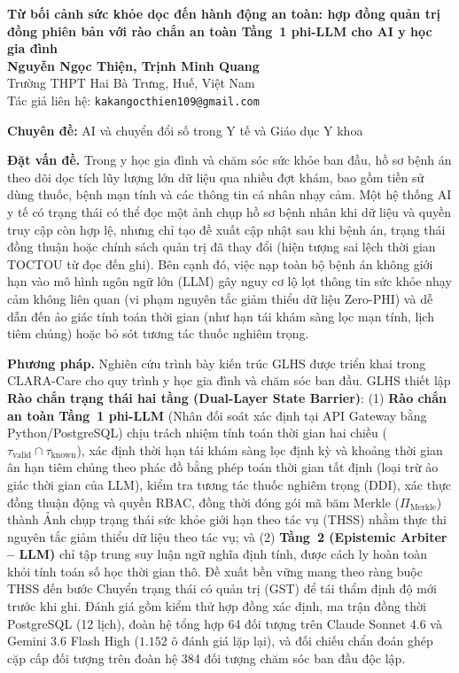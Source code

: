 \documentclass[11pt]{article}
\begin{document}
\begin{center}
{\Large\bfseries Từ bối cảnh sức khỏe dọc đến hành động an toàn: hợp đồng quản trị đồng phiên bản với rào chắn an toàn Tầng~1 phi-LLM cho AI y học gia đình}\\[0.7em]
\textbf{Nguyễn Ngọc Thiện, Trịnh Minh Quang}\\
Trường THPT Hai Bà Trưng, Huế, Việt Nam\\
Tác giả liên hệ: \texttt{kakangocthien109@gmail.com}
\end{center}
\textbf{Chuyên đề:} AI và chuyển đổi số trong Y tế và Giáo dục Y khoa

\textbf{Đặt vấn đề.} Trong y học gia đình và chăm sóc sức khỏe ban đầu, hồ sơ bệnh án theo dõi dọc tích lũy lượng lớn dữ liệu qua nhiều đợt khám, bao gồm tiền sử dùng thuốc, bệnh mạn tính và các thông tin cá nhân nhạy cảm. Một hệ thống AI y tế có trạng thái có thể đọc một ảnh chụp hồ sơ bệnh nhân khi dữ liệu và quyền truy cập còn hợp lệ, nhưng chỉ tạo đề xuất cập nhật sau khi bệnh án, trạng thái đồng thuận hoặc chính sách quản trị đã thay đổi (hiện tượng sai lệch thời gian TOCTOU từ đọc đến ghi). Bên cạnh đó, việc nạp toàn bộ bệnh án không giới hạn vào mô hình ngôn ngữ lớn (LLM) gây nguy cơ lộ lọt thông tin sức khỏe nhạy cảm không liên quan (vi phạm nguyên tắc giảm thiểu dữ liệu Zero-PHI) và dễ dẫn đến ảo giác tính toán thời gian (như hạn tái khám sàng lọc mạn tính, lịch tiêm chủng) hoặc bỏ sót tương tác thuốc nghiêm trọng.

\textbf{Phương pháp.} Nghiên cứu trình bày kiến trúc GLHS được triển khai trong CLARA-Care cho quy trình y học gia đình và chăm sóc ban đầu. GLHS thiết lập \textbf{Rào chắn trạng thái hai tầng (Dual-Layer State Barrier)}: (1) \textbf{Rào chắn an toàn Tầng~1 phi-LLM} (Nhân đối soát xác định tại API Gateway bằng Python/PostgreSQL) chịu trách nhiệm tính toán thời gian hai chiều ($\tau_{\text{valid}} \cap \tau_{\text{known}}$), xác định thời hạn tái khám sàng lọc định kỳ và khoảng thời gian ân hạn tiêm chủng theo phác đồ bằng phép toán thời gian tất định (loại trừ ảo giác thời gian của LLM), kiểm tra tương tác thuốc nghiêm trọng (DDI), xác thực đồng thuận động và quyền RBAC, đồng thời đóng gói mã băm Merkle ($\Pi_{\text{Merkle}}$) thành Ảnh chụp trạng thái sức khỏe giới hạn theo tác vụ (THSS) nhằm thực thi nguyên tắc giảm thiểu dữ liệu theo tác vụ; và (2) \textbf{Tầng~2 (Epistemic Arbiter -- LLM)} chỉ tập trung suy luận ngữ nghĩa định tính, được cách ly hoàn toàn khỏi tính toán số học thời gian thô. Đề xuất bền vững mang theo ràng buộc THSS đến bước Chuyển trạng thái có quản trị (GST) để tái thẩm định độ mới trước khi ghi. Đánh giá gồm kiểm thử hợp đồng xác định, ma trận đồng thời PostgreSQL (12 lịch), đoàn hệ tổng hợp 64 đối tượng trên Claude Sonnet 4.6 và Gemini 3.6 Flash High ($1.152$ ô đánh giá lặp lại), và đối chiếu chẩn đoán ghép cặp cấp đối tượng trên đoàn hệ 384 đối tượng chăm sóc ban đầu độc lập.
\end{document}
